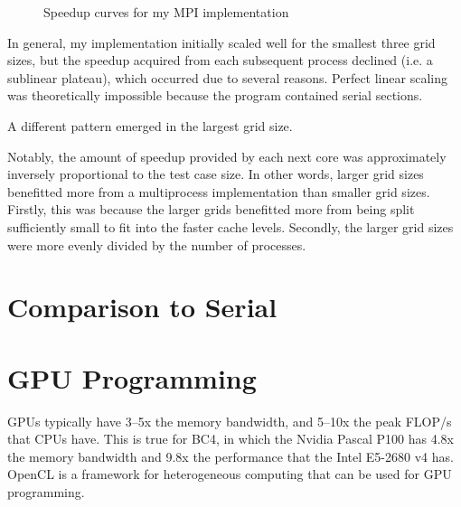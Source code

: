 \documentclass[twocolumn, a4paper]{article}
\begin{document}
\begin{figure}[htpb]
{
  }
  \caption{Speedup curves for my MPI implementation}\label{fig:scaling}
\end{figure}

In general, my implementation initially scaled well for the smallest three grid sizes, but the speedup acquired from each subsequent process declined (i.e. a sublinear plateau), which occurred due to several reasons.
Perfect linear scaling was theoretically impossible because the program contained serial sections.

A different pattern emerged in the largest grid size.

Notably, the amount of speedup provided by each next core was approximately inversely proportional to the test case size.
In other words, larger grid sizes benefitted more from a multiprocess implementation than smaller grid sizes.
Firstly, this was because the larger grids benefitted more from being split sufficiently small to fit into the faster cache levels.
Secondly, the larger grid sizes were more evenly divided by the number of processes.

\section{Comparison to Serial}

\section{GPU Programming}

GPUs typically have 3--5x the memory bandwidth, and 5--10x the peak FLOP/s that CPUs have.
This is true for BC4, in which the Nvidia Pascal P100 has 4.8x the memory bandwidth and 9.8x the performance that the Intel E5-2680 v4 has.
OpenCL is a framework for heterogeneous computing that can be used for GPU programming.
\end{document}
